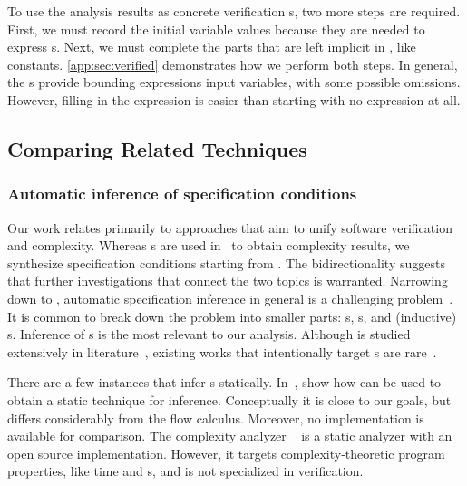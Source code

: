 To use the analysis results as concrete verification s, two more
steps are required. First, we must record the initial variable values because
they are needed to express s. Next, we must complete the
parts that are left implicit in , like constants.
\autoref{app:sec:verified} demonstrates how we perform both steps. In general,
the s provide bounding expressions \wrt input variables, with
some possible omissions. However, filling in the expression is easier than
starting with no expression at all.

\subsection{Comparing Related Techniques}
\label{sec:related-works}

\subsubsection{Automatic inference of specification conditions}
\label{subsec:automatic-inference}

Our work relates primarily to approaches that aim to unify software verification
and complexity. Whereas s are used in~\cite{nguyen2017} to
obtain complexity results, we synthesize specification conditions starting from
. The bidirectionality suggests that further
investigations that connect the two topics is warranted. Narrowing down to
, automatic specification inference in general is a
challenging problem~\cite{dillig2013,yu2023}. It is common to break down the
problem into smaller parts: s, s, and
(inductive) s. Inference of
s is the most relevant to our analysis. Although
 is studied extensively in
literature~\cite{karr1976,cousot1978,colon2003,sankaranarayanan2004,dillig2013,si2018,ryan2020,yao2020,yu2023,nguyen2014,nguyen2017},
existing works that intentionally target s are
rare~\cite{popeea2006,molina2021}.

There are a few instances that infer s statically.
In~\cite{popeea2006}, show how  can be used to
obtain a static technique for  inference. Conceptually it is
close to our goals, but  differs considerably from
the flow calculus. Moreover, no implementation is available
for comparison. The complexity analyzer ~\cite{giesl2022} is a static
analyzer with an open source implementation. However, it targets
complexity-theoretic program properties, like time and s, and is
not specialized in verification.

